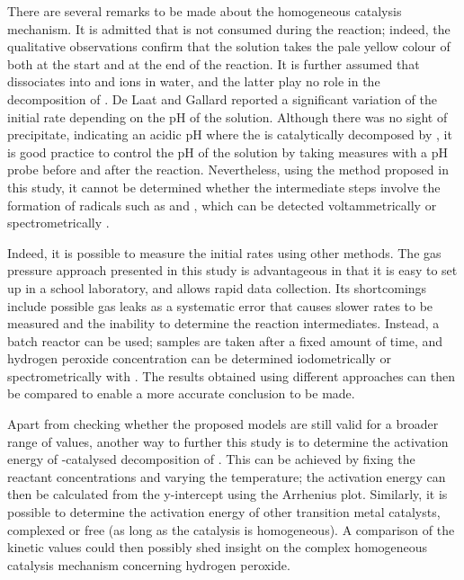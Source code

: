 \documentclass[a4paper, 12pt]{article}
\begin{document}
There are several remarks to be made about the homogeneous catalysis mechanism. It is admitted that  is not consumed during the reaction; indeed, the qualitative observations confirm that the solution takes the pale yellow colour of  both at the start and at the end of the reaction. It is further assumed that  dissociates into  and  ions in water, and the latter play no role in the decomposition of . De Laat and Gallard \cite{de_laat} reported a significant variation of the initial rate depending on the pH of the solution. Although there was no sight of  precipitate, indicating an acidic pH where the  is catalytically decomposed by  \cite{de_laat}, it is good practice to control the pH of the solution by taking measures with a pH probe before and after the reaction. Nevertheless, using the method proposed in this study, it cannot be determined whether the intermediate steps involve the formation of radicals such as  and  \cite{detection} \cite{de_laat} \cite{tachiev}, which can be detected voltammetrically \cite{detection} or spectrometrically \cite{de_laat}. 

Indeed, it is possible to measure the initial rates using other methods. The gas pressure approach presented in this study is advantageous in that it is easy to set up in a school laboratory, and allows rapid data collection. Its shortcomings include possible gas leaks as a systematic error that causes slower rates to be measured and the inability to determine the reaction intermediates. Instead, a batch reactor can be used; samples are taken after a fixed amount of time, and hydrogen peroxide concentration can be determined iodometrically or spectrometrically with  \cite{de_laat}. The results obtained using different approaches can then be compared to enable a more accurate conclusion to be made.

Apart from checking whether the proposed models are still valid for a broader range of \ce{[H2O2]} values, another way to further this study is to determine the activation energy of -catalysed decomposition of . This can be achieved by fixing the reactant concentrations and varying the temperature; the activation energy can then be calculated from the y-intercept using the Arrhenius plot. Similarly, it is possible to determine the activation energy of other transition metal catalysts, complexed or free (as long as the catalysis is homogeneous). A comparison of the kinetic values could then possibly shed insight on the complex homogeneous catalysis mechanism concerning hydrogen peroxide.

\clearpage
\thispagestyle{empty}
\printbibliography
\thispagestyle{empty}
\end{document}
